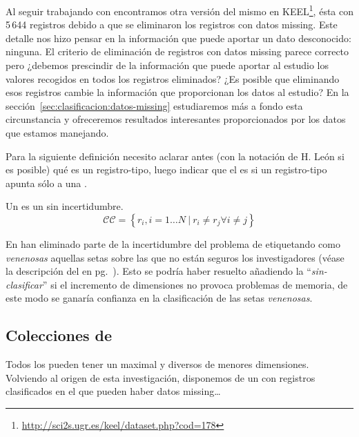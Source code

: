 Al seguir trabajando con \mushroom encontramos otra versión del mismo \dataset en KEEL\footnote{\url{http://sci2s.ugr.es/keel/dataset.php?cod=178}}, ésta con 5\,644 registros debido a que se eliminaron los registros con datos missing. Este detalle nos hizo pensar en la información que puede aportar un dato desconocido: ninguna. El criterio de eliminación de registros con datos missing parece correcto pero ¿debemos prescindir de la información que puede aportar al estudio los valores recogidos en todos los registros eliminados? ¿Es posible que eliminando esos registros cambie la información que proporcionan los datos al estudio? En la sección~\ref{sec:clasificacion:datos-missing} estudiaremos más a fondo esta circunstancia y ofreceremos resultados interesantes proporcionados por los datos que estamos manejando.



Para la siguiente definición necesito aclarar antes (con la notación de H. León si es posible) qué es un registro-tipo, luego indicar que el \catalogo es \CC si un registro-tipo apunta sólo a una \clase.

\begin{defn}[\CC] Un \CC es un \catalogo sin incertidumbre.
   $$\mathcal{CC} = \left\{r_i, i = 1\ldots N\ | \ r_i \neq r_j \forall i \neq j\right\}$$
\label{def:catalogo-completo}
\end{defn}

En \mushroom han eliminado parte de la incertidumbre del problema de \clasificacion etiquetando como \emph{venenosas} aquellas setas sobre las que no están seguros los investigadores (véase la descripción del \dataset en pg.~\pageref{cita:incertidumbre-suprimida-en-mushroom}). Esto se podría haber resuelto añadiendo la \clase "`\emph{sin-clasificar}"' si el incremento de dimensiones no provoca problemas de memoria, de este modo se ganaría confianza en la clasificación de las setas \emph{venenosas}.







\subsection{Colecciones de \CCs}
\label{sec:clasificacion:catalogo-completo:colecciones}
%

Todos los \CCs pueden tener un \CC maximal y diversos \CCs de menores dimensiones. Volviendo al origen de esta investigación, disponemos de un \dataset con registros clasificados en el que pueden haber datos missing\ldots 
